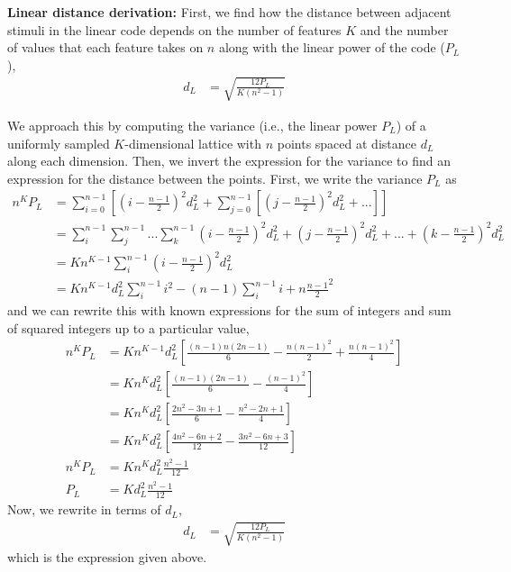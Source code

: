 \documentclass[letter,12pt]{article}
\begin{document}
\textbf{Linear distance derivation:}
First, we find how the distance between
adjacent stimuli in the linear code depends on the number of features $K$ and
the number of values that each feature takes on $n$ along with the linear power
of the code ($P_{L}$),
\begin{align}
d_{L} &= \sqrt{\frac{12 P_{L}}{K (n^2 - 1)}}
\end{align}

We approach this by computing the variance (i.e., the linear power $P_{L}$)
of a uniformly sampled $K$-dimensional lattice with $n$ points spaced at distance
$d_{L}$ along each dimension. Then, we
invert the expression for the variance to find an expression for the distance
between the points. First, we write the variance $P_{L}$ as
\begin{align}
  n^{K} P_{L} &=  \sum_{i = 0}^{n - 1} \left[
    \left(i - \frac{n - 1}{2}\right)^{2}d_{L}^{2} + \sum_{j = 0}^{n - 1}
    \left[\left(j - \frac{n - 1}{2}\right)^{2}d_{L}^{2} + ... \right]\right] \\
  &= \sum_{i}^{n - 1} \sum_{j}^{n-1} ... \sum_{k}^{n - 1}
  \left(i - \frac{n - 1}{2}\right)^{2}d_{L}^{2} + 
  \left(j - \frac{n - 1}{2}\right)^{2}d_{L}^{2} + ... +
  \left(k - \frac{n - 1}{2}\right)^{2}d_{L}^{2} \\
  &= K n^{K - 1} \sum_{i}^{n - 1}
  \left(i - \frac{n - 1}{2}\right)^{2}d_{L}^{2} \\
  &= K n^{K - 1} d_{L}^{2}\sum_{i}^{n - 1} i^{2} - (n - 1) \sum_{i}^{n-1} i
  + n \frac{n - 1}{2}^{2}
\end{align}
and we can rewrite this with known expressions for the sum of integers
and sum of squared integers up to a particular value,
\begin{align}
  n^{K} P_{L} &= K n^{K - 1} d_{L}^{2}
  \left[\frac{(n - 1)n(2n - 1)}{6} - \frac{n(n - 1)^{2}}{2}
    + \frac{n(n - 1)^{2}}{4}\right] \\
  &= K n^{K} d_{L}^{2} \left[\frac{(n - 1)(2n - 1)}{6} - \frac{(n - 1)^{2}}{4}
    \right] \\
  &= K n^{K} d_{L}^{2} \left[\frac{2n^{2} - 3n + 1}{6}
    - \frac{n^{2} - 2n + 1}{4}\right] \\
  &= K n^{K} d_{L}^{2} \left[\frac{4n^{2} - 6n + 2}{12}
    - \frac{3n^{2} - 6n + 3}{12}\right] \\
  n^{K} P_{L} &= K n^{K} d_{L}^{2} \frac{n^{2} - 1}{12} \\
  P_{L} &= K d_{L}^{2} \frac{n^{2} - 1}{12} 
\end{align}
Now, we rewrite in terms of $d_{L}$,
\begin{align}
  d_{L} &= \sqrt{\frac{12 P_{L}}{K \left(n^{2} - 1\right)}}
\end{align}
which is the expression given above.
\end{document}
